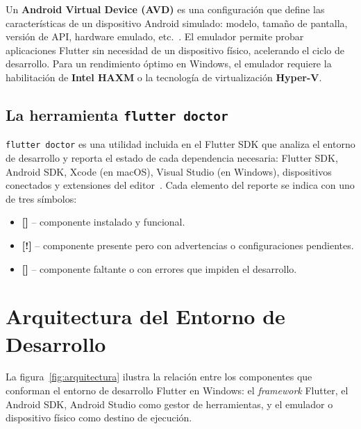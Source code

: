 \documentclass[12pt,a4paper]{article}
\begin{document}
Un \textbf{Android Virtual Device (AVD)} es una configuración que define las características de un dispositivo Android simulado: modelo, tamaño de pantalla, versión de API, hardware emulado, etc.~\cite{androiddev2024}. El emulador permite probar aplicaciones Flutter sin necesidad de un dispositivo físico, acelerando el ciclo de desarrollo. Para un rendimiento óptimo en Windows, el emulador requiere la habilitación de \textbf{Intel HAXM} o la tecnología de virtualización \textbf{Hyper-V}.

\subsection{La herramienta \texttt{flutter doctor}}

\texttt{flutter doctor} es una utilidad incluida en el Flutter SDK que analiza el entorno de desarrollo y reporta el estado de cada dependencia necesaria: Flutter SDK, Android SDK, Xcode (en macOS), Visual Studio (en Windows), dispositivos conectados y extensiones del editor~\cite{flutter2024}. Cada elemento del reporte se indica con uno de tres símbolos:

\begin{itemize}
  \item \textbf{[\checkmark]} -- componente instalado y funcional.
  \item \textbf{[!]} -- componente presente pero con advertencias o configuraciones pendientes.
  \item \textbf{[{\texttimes}]} -- componente faltante o con errores que impiden el desarrollo.
\end{itemize}

\section{Arquitectura del Entorno de Desarrollo}

La figura~\ref{fig:arquitectura} ilustra la relación entre los componentes que conforman el entorno de desarrollo Flutter en Windows: el \textit{framework} Flutter, el Android SDK, Android Studio como gestor de herramientas, y el emulador o dispositivo físico como destino de ejecución.
\end{document}
